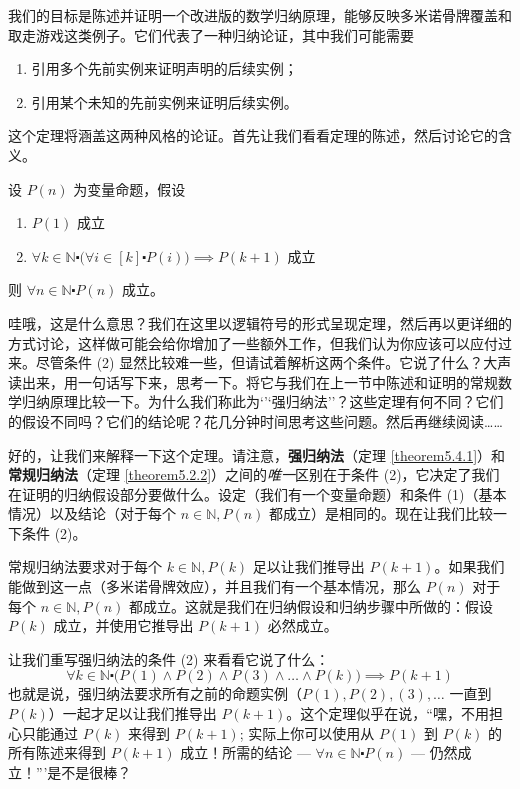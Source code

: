 我们的目标是陈述并证明一个改进版的数学归纳原理，能够反映多米诺骨牌覆盖和取走游戏这类例子。它们代表了一种归纳论证，其中我们可能需要
\begin{enumerate}[label=(\arabic*)]
    \item 引用多个先前实例来证明声明的后续实例；
    \item 引用某个未知的先前实例来证明后续实例。
\end{enumerate}
这个定理将涵盖这两种风格的论证。首先让我们看看定理的陈述，然后讨论它的含义。

\begin{theorem}\label{theorem5.4.1}
    设 $P(n)$ 为变量命题，假设
    \begin{enumerate}[label=(\arabic*)]
        \item $P(1)$ 成立
        \item $\forall k \in \mathbb{N} \centerdot \big(\forall i \in [k] \centerdot P(i)\big) \implies P(k+1)$ 成立
    \end{enumerate}
    则 $\forall n \in \mathbb{N} \centerdot P(n)$ 成立。
\end{theorem}

哇哦，这是什么意思？我们在这里以逻辑符号的形式呈现定理，然后再以更详细的方式讨论，这样做可能会给你增加了一些额外工作，但我们认为你应该可以应付过来。尽管条件 (2) 显然比较难一些，但请试着解析这两个条件。它说了什么？大声读出来，用一句话写下来，思考一下。将它与我们在上一节中陈述和证明的常规数学归纳原理比较一下。为什么我们称此为`'`强归纳法''？这些定理有何不同？它们的假设不同吗？它们的结论呢？花几分钟时间思考这些问题。然后再继续阅读……

好的，让我们来解释一下这个定理。请注意，\textbf{强归纳法}（定理 \ref{theorem5.4.1}）和\textbf{常规归纳法}（定理 \ref{theorem5.2.2}）之间的\emph{唯一}区别在于条件 (2)，它决定了我们在证明的归纳假设部分要做什么。设定（我们有一个变量命题）和条件 (1)（基本情况）以及结论（对于每个 $n \in \mathbb{N}, P(n)$ 都成立）是相同的。现在让我们比较一下条件 (2)。

常规归纳法要求对于每个 $k \in \mathbb{N}, P(k)$ 足以让我们推导出 $P(k+1)$。如果我们能做到这一点（多米诺骨牌效应），并且我们有一个基本情况，那么 $P(n)$ 对于每个 $n \in \mathbb{N}, P(n)$ 都成立。这就是我们在归纳假设和归纳步骤中所做的：假设 $P(k)$ 成立，并使用它推导出 $P(k + 1)$ 必然成立。

让我们重写强归纳法的条件 (2) 来看看它说了什么：
\[\forall k \in \mathbb{N} \centerdot \big(P(1) \land P(2) \land P(3) \land \dots \land P(k)) \implies P(k+1)\]
也就是说，强归纳法要求所有之前的命题实例（$P(1), P(2), (3), \dots$ 一直到 $P(k)$）一起才足以让我们推导出 $P(k+1)$。这个定理似乎在说，``嘿，不用担心只能通过 $P(k)$ 来得到 $P(k+1)$; 实际上你可以使用从 $P(1)$ 到 $P(k)$ 的所有陈述来得到 $P(k+1)$ 成立！所需的结论 --- $\forall n \in \mathbb{N} \centerdot P(n)$ --- 仍然成立！'''是不是很棒？

